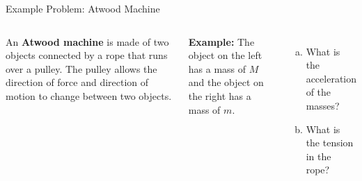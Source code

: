 \documentclass[12pt,compress,aspectratio=169]{beamer}
\begin{document}
\begin{frame}{Example Problem: Atwood Machine}
  \begin{columns}
    \centering

    An \textbf{Atwood machine} is made of two objects connected by a rope that
    runs over a pulley. The pulley allows the direction of force and direction
    of motion to change between two objects.
    
    \vspace{.2in}\textbf{Example:} The object on the left has a mass of $M$ and
    the object on the right has a mass of $m$.
    \begin{enumerate}[(a)]
    \item What is the acceleration of the masses?
    \item What is the tension in the rope?
    \end{enumerate}
  \end{columns}
\end{frame}
%
\end{document}
